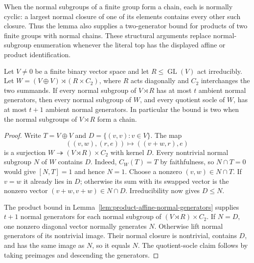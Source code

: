 When the normal subgroups of a finite group form a chain, each is normally
cyclic: a largest normal closure of one of its elements contains every
other such closure. Thus the lemma also supplies a two-generator bound
for products of two finite groups with normal chains. These structural
arguments replace normal-subgroup enumeration whenever the literal top
has the displayed affine or product identification.

\begin{lemma}
\label{lem:diagonal-binary-block-pairs}
Let $V\ne0$ be a finite binary vector space and let
$R\leq\operatorname{GL}(V)$ act irreducibly. Let
$W=(V\oplus V)\rtimes(R\times C_2)$, where $R$ acts diagonally
and $C_2$ interchanges the two summands. If every normal subgroup of
$V\rtimes R$ has at most $t$ ambient normal generators, then every
normal subgroup of $W$, and every quotient socle of $W$, has at most
$t+1$ ambient normal generators. In particular the bound is two when
the normal subgroups of $V\rtimes R$ form a chain.
\end{lemma}
\begin{proof}
Write $T=V\oplus V$ and $D=\{(v,v):v\in V\}$. The map
\[
 ((v,w),(r,e))\longmapsto((v+w,r),e)
\]
is a surjection $W\twoheadrightarrow(V\rtimes R)\times C_2$
with kernel $D$. Every nontrivial normal subgroup $N$ of $W$ contains
$D$. Indeed, $C_W(T)=T$ by faithfulness, so $N\cap T=0$ would give
$[N,T]=1$ and hence $N=1$. Choose a nonzero $(v,w)\in N\cap T$.
If $v=w$ it already lies in $D$; otherwise its sum with its swapped
vector is the nonzero vector $(v+w,v+w)\in N\cap D$.
Irreducibility now gives $D\leq N$.

The product bound in Lemma~\ref{lem:product-affine-normal-generators}
supplies $t+1$ normal generators for each normal subgroup of
$(V\rtimes R)\times C_2$. If $N=D$, one nonzero diagonal vector
normally generates $N$. Otherwise lift normal generators of its
nontrivial image. Their normal closure is nontrivial, contains $D$,
and has the same image as $N$, so it equals $N$. The quotient-socle
claim follows by taking preimages and descending the generators.
\end{proof}


